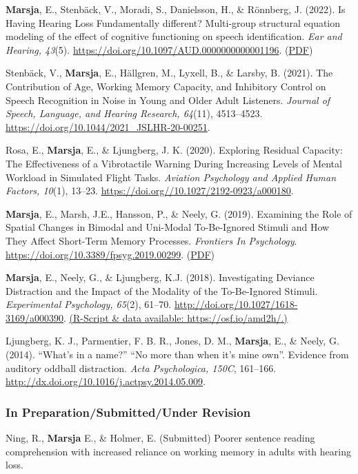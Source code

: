 \documentclass[]{article}
\begin{document}
\textbf{Marsja}, E., Stenbäck, V., Moradi, S., Danielsson, H., \&
Rönnberg, J. (2022). Is Having Hearing Loss Fundamentally different?
Multi-group structural equation modeling of the effect of cognitive
functioning on speech identification. \emph{Ear and Hearing, 43}(5).
\url{https://doi.org/10.1097/AUD.0000000000001196}.
(\href{https://tinyurl.com/eandhsem}{PDF})

Stenbäck, V., \textbf{Marsja}, E., Hällgren, M., Lyxell, B., \& Larsby,
B. (2021). The Contribution of Age, Working Memory Capacity, and
Inhibitory Control on Speech Recognition in Noise in Young and Older
Adult Listeners. \emph{Journal of Speech, Language, and Hearing
Research, 64}(11), 4513--4523.
\url{https://doi.org/10.1044/2021_JSLHR-20-00251}.

Rosa, E., \textbf{Marsja}, E., \& Ljungberg, J. K. (2020). Exploring
Residual Capacity: The Effectiveness of a Vibrotactile Warning During
Increasing Levels of Mental Workload in Simulated Flight Tasks.
\emph{Aviation Psychology and Applied Human Factors, 10}(1), 13--23.
\url{https://doi.org//10.1027/2192-0923/a000180}.

\textbf{Marsja}, E., Marsh, J.E., Hansson, P., \& Neely, G. (2019).
Examining the Role of Spatial Changes in Bimodal and Uni-Modal
To-Be-Ignored Stimuli and How They Affect Short-Term Memory Processes.
\emph{Frontiers In Psychology}.
\url{https://doi.org/10.3389/fpsyg.2019.00299}.
(\href{https://tinyurl.com/spativib}{PDF})

\textbf{Marsja}, E., Neely, G., \& Ljungberg, K.J. (2018). Investigating
Deviance Distraction and the Impact of the Modality of the To-Be-Ignored
Stimuli. \emph{Experimental Psychology, 65}(2), 61--70.
\url{http://doi.org/10.1027/1618-3169/a000390}.
\href{https://osf.io/amd2h/}{(R-Script \& data available:
https://osf.io/amd2h/.)}

Ljungberg, K. J., Parmentier, F. B. R., Jones, D. M., \textbf{Marsja},
E., \& Neely, G. (2014). ``What's in a name?'' ``No more than when it's
mine own''. Evidence from auditory oddball distraction. \emph{Acta
Psychologica, 150C}, 161--166.
\href{http://doi.org/10.1027/1618-3169/a000390}{http://dx.doi.org/10.1016/j.actpsy.2014.05.009}.

\subsubsection{In Preparation/Submitted/Under
Revision}\label{in-preparationsubmittedunder-revision}

Ning, R., \textbf{Marsja} E., \& Holmer, E. (Submitted) Poorer sentence
reading comprehension with increased reliance on working memory in
adults with hearing loss.
\end{document}

